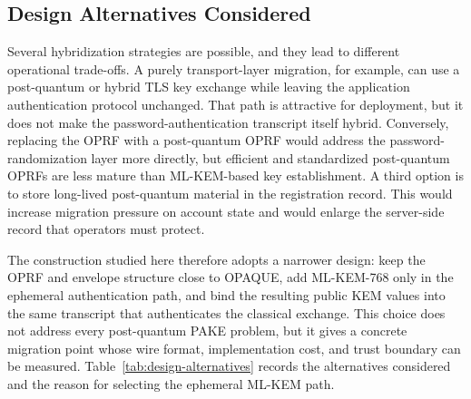 \documentclass[preprint,12pt]{elsarticle}
\theoremstyle{remark}
\begin{document}
\subsection{Design Alternatives Considered}

Several hybridization strategies are possible, and they lead to
different operational trade-offs. A purely transport-layer migration,
for example, can use a post-quantum or hybrid TLS key exchange while
leaving the application authentication protocol unchanged. That path is
attractive for deployment, but it does not make the password-authentication
transcript itself hybrid. Conversely, replacing the OPRF with a
post-quantum OPRF would address the password-randomization layer more
directly, but efficient and standardized post-quantum OPRFs are less
mature than ML-KEM-based key establishment. A third option is to store
long-lived post-quantum material in the registration record. This would
increase migration pressure on account state and would enlarge the
server-side record that operators must protect.

The construction studied here therefore adopts a narrower design: keep
the OPRF and envelope structure close to OPAQUE, add ML-KEM-768 only in
the ephemeral authentication path, and bind the resulting public KEM
values into the same transcript that authenticates the classical
exchange. This choice does not address every post-quantum PAKE problem,
but it gives a concrete migration point whose wire format,
implementation cost, and trust boundary can be measured.
Table~\ref{tab:design-alternatives} records the alternatives considered
and the reason for selecting the ephemeral ML-KEM path.
\end{document}
